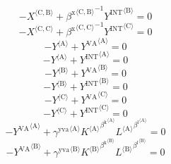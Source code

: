 \begin{equation}
-{X}^{\langle \mathrm{C},\mathrm{B}\rangle} + {{\beta^{\mathrm{x}}}^{\langle \mathrm{\mathrm{C}},\mathrm{\mathrm{B}}\rangle}}^{-1} {{Y^{\mathrm{INT}}}^{\langle \mathrm{B}\rangle}} = 0
\end{equation}
\begin{equation}
-{X}^{\langle \mathrm{C},\mathrm{C}\rangle} + {{\beta^{\mathrm{x}}}^{\langle \mathrm{\mathrm{C}},\mathrm{\mathrm{C}}\rangle}}^{-1} {{Y^{\mathrm{INT}}}^{\langle \mathrm{C}\rangle}} = 0
\end{equation}
\begin{equation}
-{Y}^{\langle \mathrm{A}\rangle} + {Y^{\mathrm{VA}}}^{\langle \mathrm{A}\rangle} = 0
\end{equation}
\begin{equation}
-{Y}^{\langle \mathrm{A}\rangle} + {Y^{\mathrm{INT}}}^{\langle \mathrm{A}\rangle} = 0
\end{equation}
\begin{equation}
-{Y}^{\langle \mathrm{B}\rangle} + {Y^{\mathrm{VA}}}^{\langle \mathrm{B}\rangle} = 0
\end{equation}
\begin{equation}
-{Y}^{\langle \mathrm{B}\rangle} + {Y^{\mathrm{INT}}}^{\langle \mathrm{B}\rangle} = 0
\end{equation}
\begin{equation}
-{Y}^{\langle \mathrm{C}\rangle} + {Y^{\mathrm{VA}}}^{\langle \mathrm{C}\rangle} = 0
\end{equation}
\begin{equation}
-{Y}^{\langle \mathrm{C}\rangle} + {Y^{\mathrm{INT}}}^{\langle \mathrm{C}\rangle} = 0
\end{equation}
\begin{equation}
-{Y^{\mathrm{VA}}}^{\langle \mathrm{A}\rangle} + {{\gamma^{\mathrm{yva}}}^{\langle \mathrm{\mathrm{A}}\rangle}} {{{K}^{\langle \mathrm{A}\rangle}}^{{\beta^{\mathrm{k}}}^{\langle \mathrm{\mathrm{A}}\rangle}}} {{{L}^{\langle \mathrm{A}\rangle}}^{{\beta^{\mathrm{l}}}^{\langle \mathrm{\mathrm{A}}\rangle}}} = 0
\end{equation}
\begin{equation}
-{Y^{\mathrm{VA}}}^{\langle \mathrm{B}\rangle} + {{\gamma^{\mathrm{yva}}}^{\langle \mathrm{\mathrm{B}}\rangle}} {{{K}^{\langle \mathrm{B}\rangle}}^{{\beta^{\mathrm{k}}}^{\langle \mathrm{\mathrm{B}}\rangle}}} {{{L}^{\langle \mathrm{B}\rangle}}^{{\beta^{\mathrm{l}}}^{\langle \mathrm{\mathrm{B}}\rangle}}} = 0
\end{equation}
